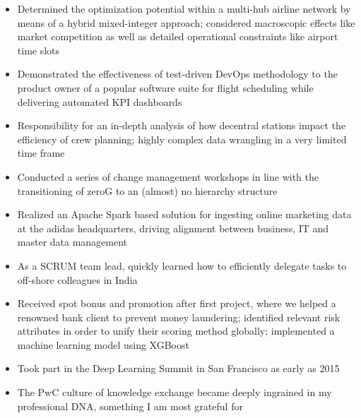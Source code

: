 \documentclass[10pt,a4paper,ragged2e,withhyper]{altacv}
\begin{document}
\begin{paracol}{2}
            \begin{itemize}
                \item Determined the optimization potential within a multi-hub airline network by means of a hybrid mixed-integer approach; considered macroscopic effects like market competition as well as detailed operational constraints like airport time slots
                \item Demonstrated the effectiveness of test-driven DevOps methodology to the product owner of a popular software suite for flight scheduling while delivering automated KPI dashboards
                \item Responsibility for an in-depth analysis of how decentral stations impact the efficiency of crew planning; highly complex data wrangling in a very limited time frame
                \item Conducted a series of change management workshops in line with the transitioning of zeroG to an (almost) no hierarchy structure
            \end{itemize}
            \divider

            \begin{itemize}
                \item Realized an Apache Spark based solution for ingesting online marketing data at the adidas headquarters, driving alignment between business, IT and master data management
                \item As a SCRUM team lead, quickly learned how to efficiently delegate tasks to off-shore colleagues in India
            \end{itemize}
            \divider

            \begin{itemize}
                \item Received spot bonus and promotion after first project, where we helped a renowned bank client to prevent money laundering; identified relevant risk attributes in order to unify their scoring method globally; implemented a machine learning model using XGBoost
                \item Took part in the Deep Learning Summit in San Francisco as early as 2015
                \item The PwC culture of knowledge exchange became deeply ingrained in my professional DNA, something I am most grateful for
            \end{itemize}
            \divider


\end{paracol}
\end{document}
